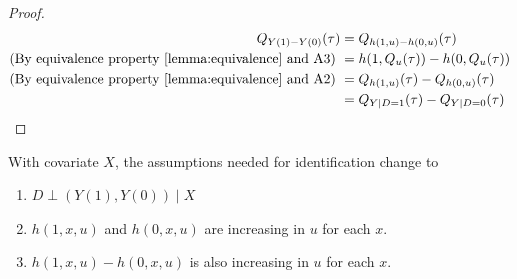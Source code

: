 \documentclass[11pt]{elegantbook}
\begin{document}
\begin{proof}
    \begin{equation}
        \begin{aligned}
            Q_{Y(1)-Y(0)}(\tau)&=Q_{h(1,u)-h(0,u)}(\tau)\\
            \textnormal{(By equivalence property \ref{lemma:equivalence} and A3) }&=h(1,Q_u(\tau))-h(0,Q_u(\tau))\\
            \textnormal{(By equivalence property \ref{lemma:equivalence} and A2) }&=Q_{h(1,u)}(\tau)-Q_{h(0,u)}(\tau)\\
            &=Q_{Y|D=1}(\tau)-Q_{Y|D=0}(\tau)
        \end{aligned}
        \nonumber
    \end{equation}
\end{proof}
With covariate $X$, the assumptions needed for identification change to
\begin{assumption}
    \begin{enumerate}[{A}1.]
        \item $D\perp (Y(1),Y(0)) \mid X$
        \item $h(1,x,u)$ and $h(0,x,u)$ are increasing in $u$ for each $x$.
        \item $h(1,x,u)-h(0,x,u)$ is also increasing in $u$ for each $x$.
    \end{enumerate}
\end{assumption}
\end{document}
